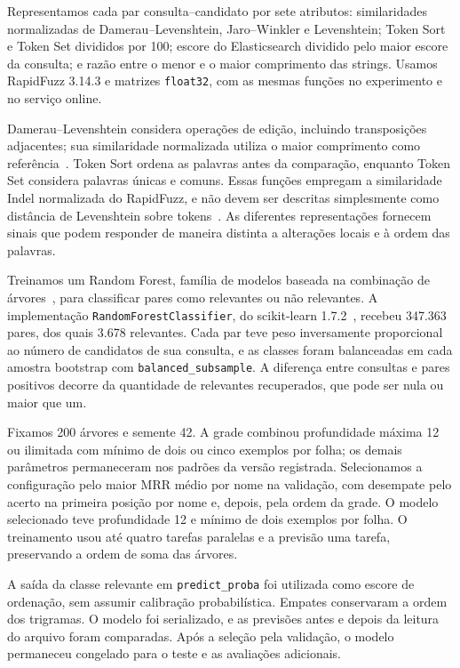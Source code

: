Representamos cada par consulta--candidato por sete atributos: similaridades normalizadas de Damerau--Levenshtein, Jaro--Winkler e Levenshtein; Token Sort e Token Set divididos por 100; escore do Elasticsearch dividido pelo maior escore da consulta; e razão entre o menor e o maior comprimento das strings. Usamos RapidFuzz 3.14.3 e matrizes \texttt{float32}, com as mesmas funções no experimento e no serviço online.

Damerau--Levenshtein considera operações de edição, incluindo transposições adjacentes; sua similaridade normalizada utiliza o maior comprimento como referência~\cite{rapidDL}. Token Sort ordena as palavras antes da comparação, enquanto Token Set considera palavras únicas e comuns. Essas funções empregam a similaridade Indel normalizada do RapidFuzz, e não devem ser descritas simplesmente como distância de Levenshtein sobre tokens~\cite{rapidFuzz}. As diferentes representações fornecem sinais que podem responder de maneira distinta a alterações locais e à ordem das palavras.

Treinamos um Random Forest, família de modelos baseada na combinação de árvores~\cite{breiman2001}, para classificar pares como relevantes ou não relevantes. A implementação \texttt{RandomForestClassifier}, do scikit-learn 1.7.2~\cite{sklearnRF}, recebeu 347.363 pares, dos quais 3.678 relevantes. Cada par teve peso inversamente proporcional ao número de candidatos de sua consulta, e as classes foram balanceadas em cada amostra bootstrap com \texttt{balanced\_subsample}. A diferença entre consultas e pares positivos decorre da quantidade de relevantes recuperados, que pode ser nula ou maior que um.

Fixamos 200 árvores e semente 42. A grade combinou profundidade máxima 12 ou ilimitada com mínimo de dois ou cinco exemplos por folha; os demais parâmetros permaneceram nos padrões da versão registrada. Selecionamos a configuração pelo maior MRR médio por nome na validação, com desempate pelo acerto na primeira posição por nome e, depois, pela ordem da grade. O modelo selecionado teve profundidade 12 e mínimo de dois exemplos por folha. O treinamento usou até quatro tarefas paralelas e a previsão uma tarefa, preservando a ordem de soma das árvores.

A saída da classe relevante em \texttt{predict\_proba} foi utilizada como escore de ordenação, sem assumir calibração probabilística. Empates conservaram a ordem dos trigramas. O modelo foi serializado, e as previsões antes e depois da leitura do arquivo foram comparadas. Após a seleção pela validação, o modelo permaneceu congelado para o teste e as avaliações adicionais.

